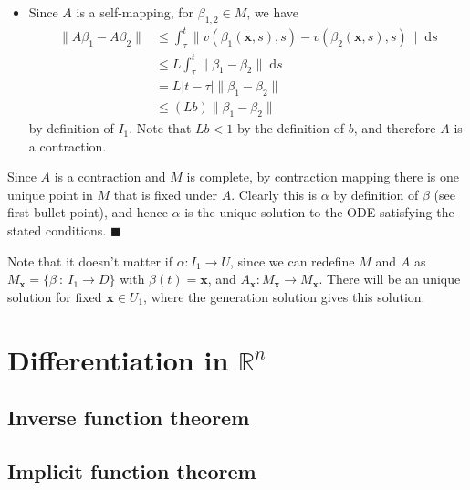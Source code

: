\documentclass[letter-paper]{tufte-book}
\newenvironment{proof}[1][Proof]{\begin{trivlist}
\item[\hskip \labelsep {\bfseries #1}]}{\end{trivlist}}
\newcommand{\qed}{\hfill$\blacksquare$}
\begin{document}
\begin{proof}
\begin{itemize}
    \item Since $A$ is a self-mapping, for $\beta_{1,2} \in M$, we have
    \begin{align*}
      \|A\beta_1 - A\beta_2\| &\leq \int_\tau^t \|v(\beta_1(\boldsymbol{x}, s), s) - v(\beta_2(\boldsymbol{x}, s), s) \|\; \mathrm{d}s \\
        &\leq L \int_\tau^t \|\beta_1 - \beta_2\|\; \mathrm{d}s\\
        &= L |t - \tau| \|\beta_1 - \beta_2\|\\
        &\leq (Lb) \|\beta_1 - \beta_2\|
    \end{align*}
    by definition of $I_1$. Note that $Lb < 1$ by the definition of
    $b$, and therefore $A$ is a contraction.
  \end{itemize}
  Since $A$ is a contraction and $M$ is complete, by contraction mapping there
  is one unique point in $M$ that is fixed under $A$. Clearly this is $\alpha$
  by definition of $\beta$ (see first bullet point), and hence $\alpha$ is the
  unique solution to the ODE satisfying the stated conditions. \qed
\end{proof}

Note that it doesn't matter if $\alpha : I_1 \to U$, since we can redefine $M$
and $A$ as $M_{\boldsymbol{x}} = \{\beta\ :\ I_1 \to D\}$ with $\beta(t) =
\boldsymbol{x}$, and $A_{\boldsymbol{x}} : M_{\boldsymbol{x}} \to
M_{\boldsymbol{x}}$. There will be an unique solution for fixed $\boldsymbol{x}
\in U_1$, where the generation solution gives this solution.


\section{Differentiation in $\mathbb{R}^n$}


\subsection{Inverse function theorem}


\subsection{Implicit function theorem}
\end{document}
